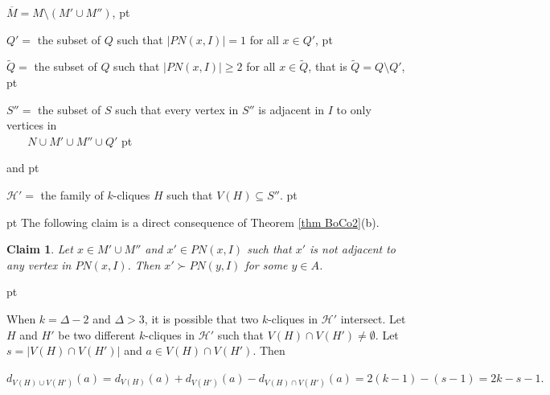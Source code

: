 \documentclass[11pt]{article}
\newtheorem{claim}{Claim}
\newcommand{\smallqed}{{\tiny ($\Box$)}}
\newcommand{\proof}{\noindent\textbf{Proof. }}
\newcommand{\2}{ \vspace{0.2cm} }
\newcommand{\1}{ \vspace{0.1cm} }
\begin{document}
\indent $\overline{M} = M \setminus (M' \cup M'')$,
 pt

\indent $Q' =$ the subset of $Q$ such that $|PN(x, I)| = 1$ for all $x \in Q'$,
 pt

\indent $\tilde{Q} =$ the subset of $Q$ such that $|PN(x, I)| \geq 2$ for all $x \in \tilde{Q}$, that is $\tilde{Q} = Q \setminus Q'$,
 pt

\indent $S'' =$ the subset of $S$ such that every vertex in $S''$ is adjacent in $I$ to only vertices in\\
\indent $~~~~~~~$ $N \cup M' \cup M'' \cup Q'$
 pt

\noindent and
 pt

\indent $\mathcal{H}' =$ the family of $k$-cliques $H$ such that $V(H) \subseteq S''$.
 pt

 pt
The following claim is a direct consequence of Theorem \ref{thm BoCo2}(b).

\begin{claim}\label{c31}
Let $x \in M' \cup M''$ and $x' \in PN(x, I)$ such that $x'$ is not adjacent to any vertex in $PN(x, I)$. Then $x' \succ PN(y, I)$ for some $y \in A$.
\end{claim}

{} pt



\indent When $k = \Delta - 2$ and $\Delta > 3$, it is possible that two $k$-cliques in $\mathcal{H}'$ intersect. Let $H$ and $H'$ be two different $k$-cliques in $\mathcal{H}'$ such that $V(H) \cap V(H') \neq \emptyset$. Let $s = |V(H) \cap V(H')|$ and $a \in V(H) \cap V(H')$.
Then

$d_{V(H)\cup V(H')}(a)=d_{V(H)}(a)+d_{V(H')}(a)-d_{V(H)\cap V(H')}(a)=2(k-1)-(s-1)=2k-s-1.$
\end{document}
